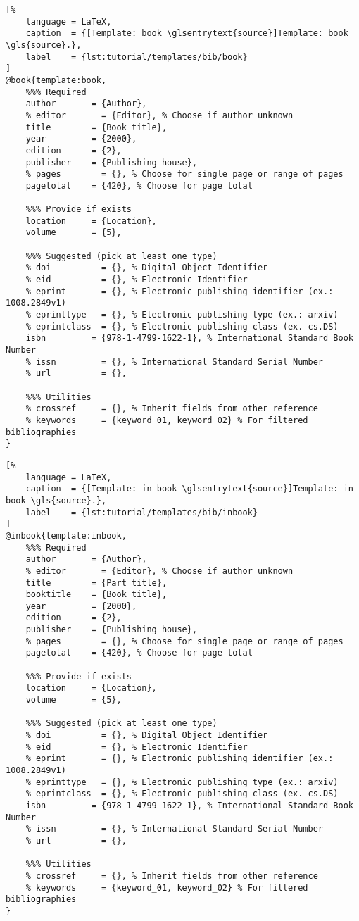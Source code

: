 \newpage
\begin{lstlisting}[%
    language = LaTeX,
    caption  = {[Template: book \glsentrytext{source}]Template: book \gls{source}.},
    label    = {lst:tutorial/templates/bib/book}
]
@book{template:book,
    %%% Required
    author       = {Author},
    % editor       = {Editor}, % Choose if author unknown
    title        = {Book title},
    year         = {2000},
    edition      = {2},
    publisher    = {Publishing house},
    % pages        = {}, % Choose for single page or range of pages
    pagetotal    = {420}, % Choose for page total
    
    %%% Provide if exists
    location     = {Location},
    volume       = {5},
    
    %%% Suggested (pick at least one type)
    % doi          = {}, % Digital Object Identifier
    % eid          = {}, % Electronic Identifier
    % eprint       = {}, % Electronic publishing identifier (ex.: 1008.2849v1)
    % eprinttype   = {}, % Electronic publishing type (ex.: arxiv)
    % eprintclass  = {}, % Electronic publishing class (ex. cs.DS)
    isbn         = {978-1-4799-1622-1}, % International Standard Book Number
    % issn         = {}, % International Standard Serial Number
    % url          = {},
    
    %%% Utilities
    % crossref     = {}, % Inherit fields from other reference
    % keywords     = {keyword_01, keyword_02} % For filtered bibliographies
}
\end{lstlisting}

\newpage
\begin{lstlisting}[%
    language = LaTeX,
    caption  = {[Template: in book \glsentrytext{source}]Template: in book \gls{source}.},
    label    = {lst:tutorial/templates/bib/inbook}
]
@inbook{template:inbook,
    %%% Required
    author       = {Author},
    % editor       = {Editor}, % Choose if author unknown
    title        = {Part title},
    booktitle    = {Book title},
    year         = {2000},
    edition      = {2},
    publisher    = {Publishing house},
    % pages        = {}, % Choose for single page or range of pages
    pagetotal    = {420}, % Choose for page total
    
    %%% Provide if exists
    location     = {Location},
    volume       = {5},
    
    %%% Suggested (pick at least one type)
    % doi          = {}, % Digital Object Identifier
    % eid          = {}, % Electronic Identifier
    % eprint       = {}, % Electronic publishing identifier (ex.: 1008.2849v1)
    % eprinttype   = {}, % Electronic publishing type (ex.: arxiv)
    % eprintclass  = {}, % Electronic publishing class (ex. cs.DS)
    isbn         = {978-1-4799-1622-1}, % International Standard Book Number
    % issn         = {}, % International Standard Serial Number
    % url          = {},
    
    %%% Utilities
    % crossref     = {}, % Inherit fields from other reference
    % keywords     = {keyword_01, keyword_02} % For filtered bibliographies
}
\end{lstlisting}

